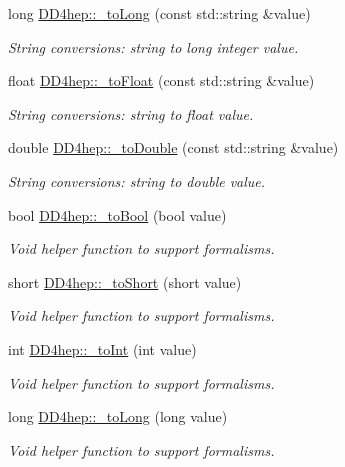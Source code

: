 \begin{DoxyCompactItemize}
long \hyperlink{group___d_d4_h_e_p___g_e_o_m_e_t_r_y_ga76414f0a43017580942c20cd07143439}{D\+D4hep\+::\+\_\+to\+Long} (const std\+::string \&value)
\begin{DoxyCompactList}\small\item\em String conversions\+: string to long integer value. \end{DoxyCompactList}\item 
float \hyperlink{group___d_d4_h_e_p___g_e_o_m_e_t_r_y_ga2f50b01d809f29936deacf00abd120be}{D\+D4hep\+::\+\_\+to\+Float} (const std\+::string \&value)
\begin{DoxyCompactList}\small\item\em String conversions\+: string to float value. \end{DoxyCompactList}\item 
double \hyperlink{group___d_d4_h_e_p___g_e_o_m_e_t_r_y_ga76e95737ef946f88e7477f69f677a4e2}{D\+D4hep\+::\+\_\+to\+Double} (const std\+::string \&value)
\begin{DoxyCompactList}\small\item\em String conversions\+: string to double value. \end{DoxyCompactList}\item 
bool \hyperlink{group___d_d4_h_e_p___g_e_o_m_e_t_r_y_ga26bde74c72a880a8a0daa324cc82d423}{D\+D4hep\+::\+\_\+to\+Bool} (bool value)
\begin{DoxyCompactList}\small\item\em Void helper function to support formalisms. \end{DoxyCompactList}\item 
short \hyperlink{group___d_d4_h_e_p___g_e_o_m_e_t_r_y_ga08bead9e87f71537d8ef0eebb368b386}{D\+D4hep\+::\+\_\+to\+Short} (short value)
\begin{DoxyCompactList}\small\item\em Void helper function to support formalisms. \end{DoxyCompactList}\item 
int \hyperlink{group___d_d4_h_e_p___g_e_o_m_e_t_r_y_ga9663e908c8754854343673024b109bd4}{D\+D4hep\+::\+\_\+to\+Int} (int value)
\begin{DoxyCompactList}\small\item\em Void helper function to support formalisms. \end{DoxyCompactList}\item 
long \hyperlink{group___d_d4_h_e_p___g_e_o_m_e_t_r_y_ga23a2ee3f07c47743d8a313babfb82841}{D\+D4hep\+::\+\_\+to\+Long} (long value)
\begin{DoxyCompactList}\small\item\em Void helper function to support formalisms. \end{DoxyCompactList}\item 

\end{DoxyCompactItemize}
